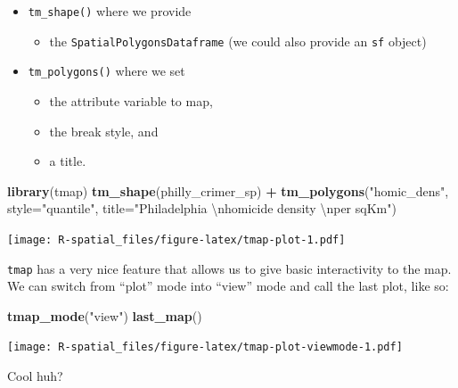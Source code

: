 \documentclass[]{book}
\newenvironment{Shaded}{\begin{snugshade}}{\end{snugshade}}
\newcommand{\KeywordTok}[1]{\textcolor[rgb]{0.13,0.29,0.53}{\textbf{#1}}}
\newcommand{\DataTypeTok}[1]{\textcolor[rgb]{0.13,0.29,0.53}{#1}}
\newcommand{\CharTok}[1]{\textcolor[rgb]{0.31,0.60,0.02}{#1}}
\newcommand{\StringTok}[1]{\textcolor[rgb]{0.31,0.60,0.02}{#1}}
\newcommand{\OperatorTok}[1]{\textcolor[rgb]{0.81,0.36,0.00}{\textbf{#1}}}
\newcommand{\NormalTok}[1]{#1}
\providecommand{\tightlist}{%
  \setlength{\itemsep}{0pt}\setlength{\parskip}{0pt}}
\theoremstyle{definition}
\theoremstyle{definition}
\theoremstyle{definition}
\theoremstyle{remark}
\begin{document}
\begin{itemize}
\tightlist
\item
  \texttt{tm\_shape()} where we provide

  \begin{itemize}
  \tightlist
  \item
    the \texttt{SpatialPolygonsDataframe} (we could also provide an
    \texttt{sf} object)
  \end{itemize}
\item
  \texttt{tm\_polygons()} where we set

  \begin{itemize}
  \tightlist
  \item
    the attribute variable to map,
  \item
    the break style, and
  \item
    a title.
  \end{itemize}
\end{itemize}

\begin{Shaded}
\begin{Highlighting}[]
\KeywordTok{library}\NormalTok{(tmap)}
\KeywordTok{tm_shape}\NormalTok{(philly_crimer_sp) }\OperatorTok{+}
\StringTok{  }\KeywordTok{tm_polygons}\NormalTok{(}\StringTok{"homic_dens"}\NormalTok{, }
              \DataTypeTok{style=}\StringTok{"quantile"}\NormalTok{, }
              \DataTypeTok{title=}\StringTok{"Philadelphia }\CharTok{\textbackslash{}n}\StringTok{homicide density }\CharTok{\textbackslash{}n}\StringTok{per sqKm"}\NormalTok{)}
\end{Highlighting}
\end{Shaded}

\texttt{[image: R-spatial\_files/figure-latex/tmap-plot-1.pdf]}

\texttt{tmap} has a very nice feature that allows us to give basic
interactivity to the map. We can switch from ``plot'' mode into ``view''
mode and call the last plot, like so:

\begin{Shaded}
\begin{Highlighting}[]
\KeywordTok{tmap_mode}\NormalTok{(}\StringTok{"view"}\NormalTok{)}
\KeywordTok{last_map}\NormalTok{()}
\end{Highlighting}
\end{Shaded}

\texttt{[image: R-spatial\_files/figure-latex/tmap-plot-viewmode-1.pdf]}

Cool huh?
\end{document}
